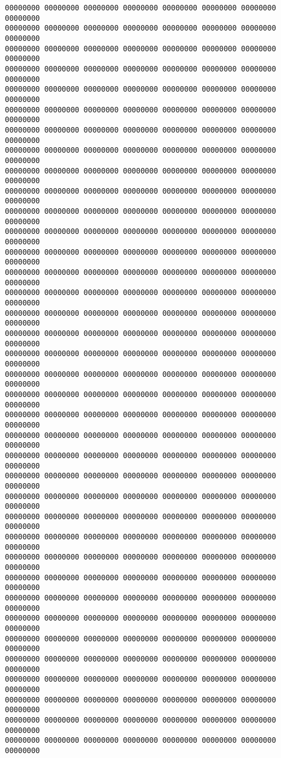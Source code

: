 \documentclass[10pt,]{book}
\begin{document}
\begin{lstlisting}
00000000 00000000 00000000 00000000 00000000 00000000 00000000 00000000
00000000 00000000 00000000 00000000 00000000 00000000 00000000 00000000
00000000 00000000 00000000 00000000 00000000 00000000 00000000 00000000
00000000 00000000 00000000 00000000 00000000 00000000 00000000 00000000
00000000 00000000 00000000 00000000 00000000 00000000 00000000 00000000
00000000 00000000 00000000 00000000 00000000 00000000 00000000 00000000
00000000 00000000 00000000 00000000 00000000 00000000 00000000 00000000
00000000 00000000 00000000 00000000 00000000 00000000 00000000 00000000
00000000 00000000 00000000 00000000 00000000 00000000 00000000 00000000
00000000 00000000 00000000 00000000 00000000 00000000 00000000 00000000
00000000 00000000 00000000 00000000 00000000 00000000 00000000 00000000
00000000 00000000 00000000 00000000 00000000 00000000 00000000 00000000
00000000 00000000 00000000 00000000 00000000 00000000 00000000 00000000
00000000 00000000 00000000 00000000 00000000 00000000 00000000 00000000
00000000 00000000 00000000 00000000 00000000 00000000 00000000 00000000
00000000 00000000 00000000 00000000 00000000 00000000 00000000 00000000
00000000 00000000 00000000 00000000 00000000 00000000 00000000 00000000
00000000 00000000 00000000 00000000 00000000 00000000 00000000 00000000
00000000 00000000 00000000 00000000 00000000 00000000 00000000 00000000
00000000 00000000 00000000 00000000 00000000 00000000 00000000 00000000
00000000 00000000 00000000 00000000 00000000 00000000 00000000 00000000
00000000 00000000 00000000 00000000 00000000 00000000 00000000 00000000
00000000 00000000 00000000 00000000 00000000 00000000 00000000 00000000
00000000 00000000 00000000 00000000 00000000 00000000 00000000 00000000
00000000 00000000 00000000 00000000 00000000 00000000 00000000 00000000
00000000 00000000 00000000 00000000 00000000 00000000 00000000 00000000
00000000 00000000 00000000 00000000 00000000 00000000 00000000 00000000
00000000 00000000 00000000 00000000 00000000 00000000 00000000 00000000
00000000 00000000 00000000 00000000 00000000 00000000 00000000 00000000
00000000 00000000 00000000 00000000 00000000 00000000 00000000 00000000
00000000 00000000 00000000 00000000 00000000 00000000 00000000 00000000
00000000 00000000 00000000 00000000 00000000 00000000 00000000 00000000
00000000 00000000 00000000 00000000 00000000 00000000 00000000 00000000
00000000 00000000 00000000 00000000 00000000 00000000 00000000 00000000
00000000 00000000 00000000 00000000 00000000 00000000 00000000 00000000
00000000 00000000 00000000 00000000 00000000 00000000 00000000 00000000
00000000 00000000 00000000 00000000 00000000 00000000 00000000 00000000

\end{lstlisting}
\end{document}
